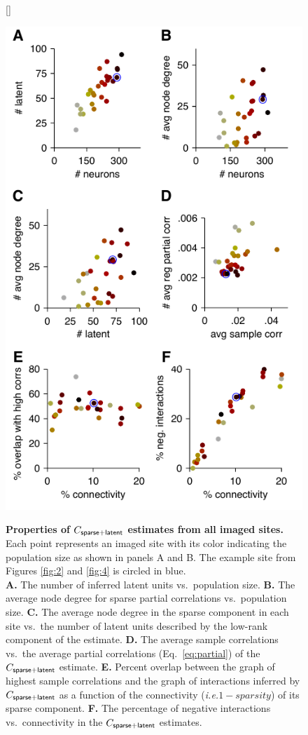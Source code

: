 \documentclass[10pt]{article}
\newcommand{\ie}{\emph{i.e.}\;}
\begin{document}
\begin{figure}    [\FBwidth]
    {\caption{{\bf Properties of $C_{\sf sparse+latent}$ estimates from all imaged sites.} 
    Each point represents an imaged site with its color indicating the population size as shown in panels A and B. The example site from Figures \ref{fig:2} and \ref{fig:4} is circled in blue. 
\\
    {\bf A.} The number of inferred latent units vs.~population size.
    {\bf B.} The average node degree for sparse partial correlations vs.~population size.
    {\bf C.} The average node degree in the sparse component in each site vs.~the number of latent units described by the low-rank component of the estimate.
    {\bf D.} The average sample correlations  vs.~the average partial correlations (Eq.~\ref{eq:partial}) of the $C_{\sf sparse+latent}$ estimate.
    {\bf E.} Percent overlap between the graph of highest sample correlations and the graph of interactions inferred by $C_{\sf sparse+latent}$ as a function of the connectivity (\ie $1-sparsity$) of its sparse component. 
    {\bf F.} The percentage of negative interactions vs.~connectivity in the $C_{\sf sparse+latent}$ estimates.
}
\label{fig:5}}
{\includegraphics{./figures/Figure05.pdf}}
\end{figure}
\end{document}
